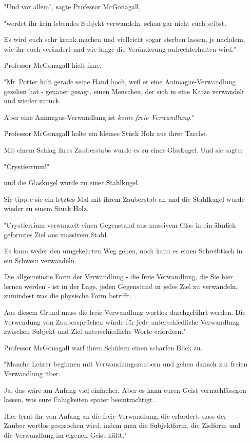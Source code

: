 {"Und vor allem", sagte Professor McGonagall,

"werdet ihr kein lebendes Subjekt verwandeln, schon gar nicht euch selbst.

Es wird euch sehr krank machen und vielleicht sogar sterben lassen, je nachdem, wie ihr euch verändert und wie lange die Veränderung aufrechterhalten wird."

Professor McGonagall hielt inne.

"Mr~Potter hält gerade seine Hand hoch, weil er eine Animagus-Verwandlung gesehen hat - genauer gesagt, einen Menschen, der sich in eine Katze verwandelt und wieder zurück.

Aber eine Animagus-Verwandlung ist \emph{keine freie Verwandlung.}"

Professor McGonagall holte ein kleines Stück Holz aus ihrer Tasche.

Mit einem Schlag ihres Zauberstabs wurde es zu einer Glaskugel. Und sie sagte:

"Crystferrium!"

und die Glaskugel wurde zu einer Stahlkugel.

Sie tippte sie ein letztes Mal mit ihrem Zauberstab an und die Stahlkugel wurde wieder zu einem Stück Holz.

"Crystferrium verwandelt einen Gegenstand aus massivem Glas in ein ähnlich geformtes Ziel aus massivem Stahl.

Es kann weder den umgekehrten Weg gehen, noch kann es einen Schreibtisch in ein Schwein verwandeln.

Die allgemeinste Form der Verwandlung - die freie Verwandlung, die Sie hier lernen werden - ist in der Lage, jeden Gegenstand in jedes Ziel zu verwandeln, zumindest was die physische Form betrifft.

Aus diesem Grund muss die freie Verwandlung wortlos durchgeführt werden. Die Verwendung von Zaubersprüchen würde für jede unterschiedliche Verwandlung zwischen Subjekt und Ziel unterschiedliche Worte erfordern."

Professor McGonagall warf ihren Schülern einen scharfen Blick zu.

"Manche Lehrer beginnen mit Verwandlungszaubern und gehen danach zur freien Verwandlung über.

Ja, das wäre am Anfang viel einfacher. Aber es kann euren Geist vernachlässigen lassen, was eure Fähigkeiten später beeinträchtigt.

Hier lernt ihr von Anfang an die freie Verwandlung, die erfordert, dass der Zauber wortlos gesprochen wird, indem man die Subjektform, die Zielform und die Verwandlung im eigenen Geist hältt."

}
